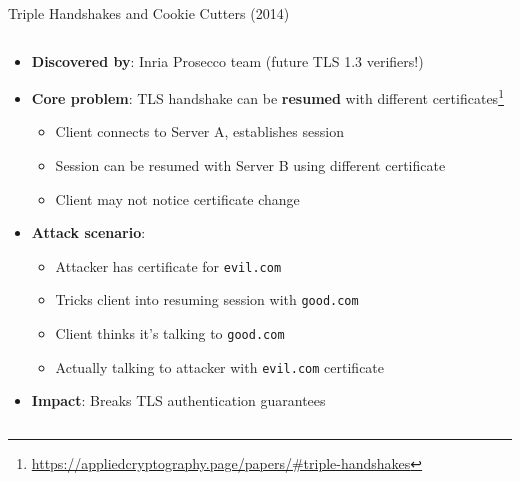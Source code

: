 \documentclass[aspectratio=169, lualatex, handout]{beamer}
\begin{document}
\begin{frame}{Triple Handshakes and Cookie Cutters (2014)}
	\begin{columns}[c]
		\begin{column}{1\textwidth}
			\begin{itemize}[<+->]
				\item \textbf{Discovered by}: Inria Prosecco team (future TLS 1.3 verifiers!)
				\item \textbf{Core problem}: TLS handshake can be \textbf{resumed} with different certificates\footnote{\url{https://appliedcryptography.page/papers/\#triple-handshakes}}
				      \begin{itemize}
					      \item Client connects to Server A, establishes session
					      \item Session can be resumed with Server B using different certificate
					      \item Client may not notice certificate change
				      \end{itemize}
				\item \textbf{Attack scenario}:
				      \begin{itemize}
					      \item Attacker has certificate for \texttt{evil.com}
					      \item Tricks client into resuming session with \texttt{good.com}
					      \item Client thinks it's talking to \texttt{good.com}
					      \item Actually talking to attacker with \texttt{evil.com} certificate
				      \end{itemize}
				\item \textbf{Impact}: Breaks TLS authentication guarantees
			\end{itemize}
		\end{column}
	\end{columns}
\end{frame}
\end{document}
